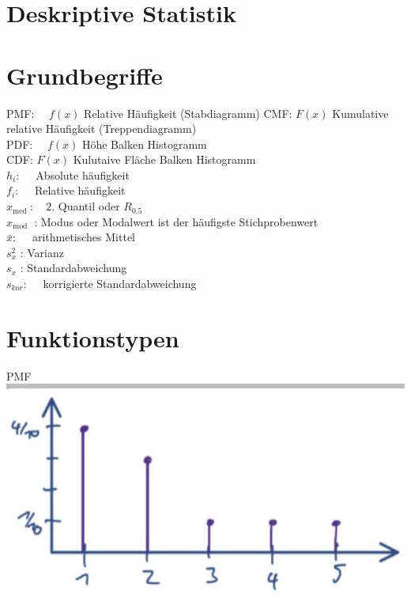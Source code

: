 \documentclass[10pt]{article}
\begin{document}
\section*{Deskriptive Statistik}
\section*{Grundbegriffe}
PMF: $\quad f(x)$ Relative Häufigkeit (Stabdiagramm) CMF: $F(x)$ Kumulative relative Häufigkeit (Treppendiagramm)\\
PDF: $\quad f(x)$ Höhe Balken Histogramm\\
CDF: $F(x)$ Kulutaive Fläche Balken Histogramm\\
$h_{i}: \quad$ Absolute häufigkeit\\
$f_{i}: \quad$ Relative häufigkeit\\
$x_{\text {med }}: \quad 2$. Quantil oder $R_{0.5}$\\
$x_{\text {mod }}$ : Modus oder Modalwert ist der häufigste Stichprobenwert\\
$\bar{x}: \quad$ arithmetisches Mittel\\
$s_{x}^{2}$ : Varianz\\
$s_{x}$ : Standardabweichung\\
$s_{k o r}: \quad$ korrigierte Standardabweichung

\section*{Funktionstypen}
PMF\\
\includegraphics[max width=\textwidth, center]{2024_12_29_0906b02acf849bda8665g-1(1)}
\end{document}

